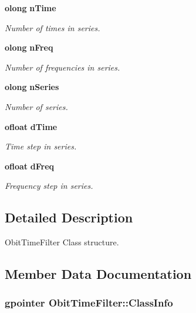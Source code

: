 \begin{CompactItemize}
{\bf olong} {\bf n\-Time}
\begin{CompactList}\small\item\em Number of times in series. \item\end{CompactList}\item 
{\bf olong} {\bf n\-Freq}
\begin{CompactList}\small\item\em Number of frequencies in series. \item\end{CompactList}\item 
{\bf olong} {\bf n\-Series}
\begin{CompactList}\small\item\em Number of series. \item\end{CompactList}\item 
{\bf ofloat} {\bf d\-Time}
\begin{CompactList}\small\item\em Time step in series. \item\end{CompactList}\item 
{\bf ofloat} {\bf d\-Freq}
\begin{CompactList}\small\item\em Frequency step in series. \item\end{CompactList}\end{CompactItemize}


\subsection{Detailed Description}
Obit\-Time\-Filter Class structure. 



\subsection{Member Data Documentation}
\subsubsection{\setlength{\rightskip}{0pt plus 5cm}gpointer {\bf Obit\-Time\-Filter::Class\-Info}}\label{structObitTimeFilter_o1}


